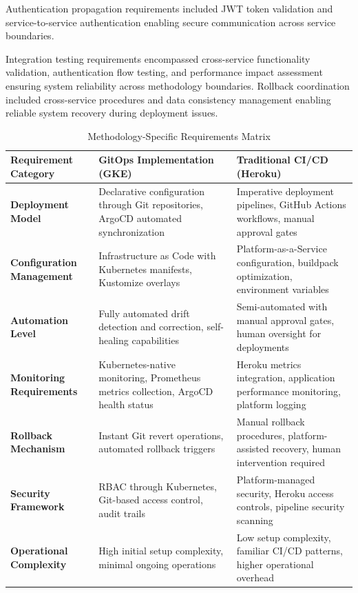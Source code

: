 Authentication propagation requirements included JWT token validation \cite{jwt_rfc7519} and service-to-service authentication enabling secure communication across service boundaries.

Integration testing requirements encompassed cross-service functionality validation, authentication flow testing, and performance impact assessment ensuring system reliability across methodology boundaries. Rollback coordination included cross-service procedures and data consistency management enabling reliable system recovery during deployment issues.
\begin{table}[H]
\centering
\small
\begin{tabular}{|p{2.5cm}|p{5cm}|p{5cm}|}
\hline
\textbf{Requirement Category} & \textbf{GitOps Implementation (GKE)} & \textbf{Traditional CI/CD (Heroku)} \\
\hline
\textbf{Deployment Model} & Declarative configuration through Git repositories, ArgoCD automated synchronization & Imperative deployment pipelines, GitHub Actions workflows, manual approval gates \\
\hline
\textbf{Configuration Management} & Infrastructure as Code with Kubernetes manifests, Kustomize overlays & Platform-as-a-Service configuration, buildpack optimization, environment variables \\
\hline
\textbf{Automation Level} & Fully automated drift detection and correction, self-healing capabilities & Semi-automated with manual approval gates, human oversight for deployments \\
\hline
\textbf{Monitoring Requirements} & Kubernetes-native monitoring, Prometheus metrics collection, ArgoCD health status & Heroku metrics integration, application performance monitoring, platform logging \\
\hline
\textbf{Rollback Mechanism} & Instant Git revert operations, automated rollback triggers & Manual rollback procedures, platform-assisted recovery, human intervention required \\
\hline
\textbf{Security Framework} & RBAC through Kubernetes, Git-based access control, audit trails & Platform-managed security, Heroku access controls, pipeline security scanning \\
\hline
\textbf{Operational Complexity} & High initial setup complexity, minimal ongoing operations & Low setup complexity, familiar CI/CD patterns, higher operational overhead \\
\hline
\end{tabular}
\caption{Methodology-Specific Requirements Matrix}
\label{tab:methodology-requirements-matrix}
\end{table}


